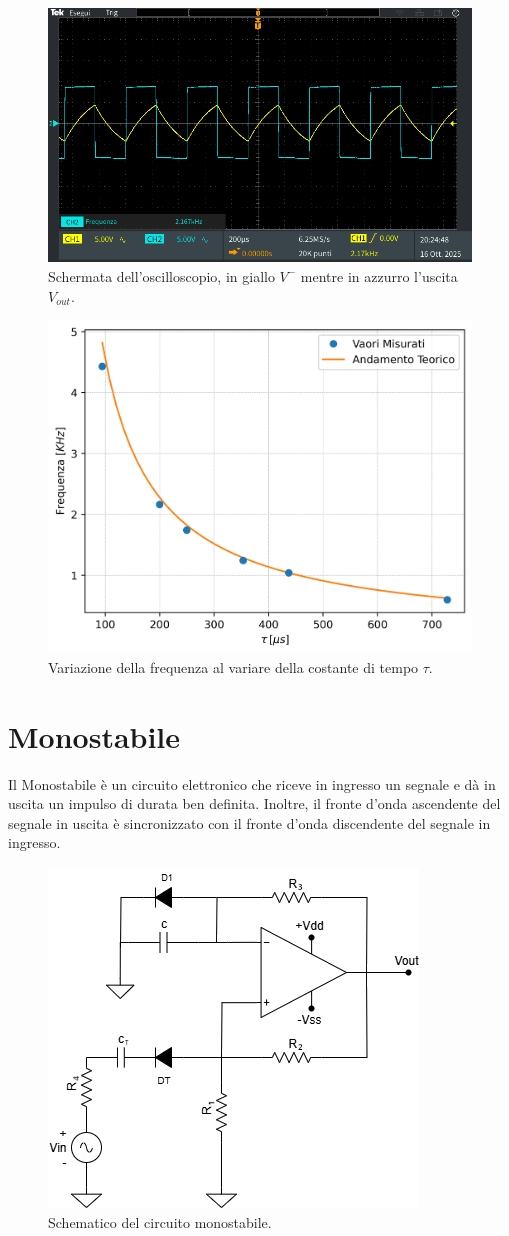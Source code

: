 \documentclass[a4paper,12pt]{article}
\begin{document}
\begin{figure}[h]
    \centering
    \includegraphics[width=0.6\linewidth]{immagini/ocillatore/oscillatore.PNG}
    \caption{Schermata dell'oscilloscopio, in giallo $V^-$ mentre in azzurro l'uscita $V_{out}$.}
    \label{fig:oscillatore}
\end{figure}

\begin{figure}[h]
	\centering
	\includegraphics[width=0.6\linewidth]{immagini/ocillatore/freq_tau.png}
	\caption{Variazione della frequenza al variare della costante di tempo $\tau$.}
	\label{fig:ocillatore_freq_tau}
\end{figure}
\FloatBarrier

\section*{Monostabile}
Il Monostabile è un circuito elettronico che riceve in ingresso un segnale e dà in uscita un impulso di durata ben definita.
Inoltre, il fronte d'onda ascendente del segnale in uscita è sincronizzato con il fronte d'onda discendente del segnale in ingresso.

\begin{figure}[h]
	\centering
	\includegraphics[width=0.6\linewidth]{immagini/monostabile/circuito.png}
	\caption{Schematico del circuito monostabile.}
	\label{fig:schematico_monostabile}
\end{figure}
\end{document}
